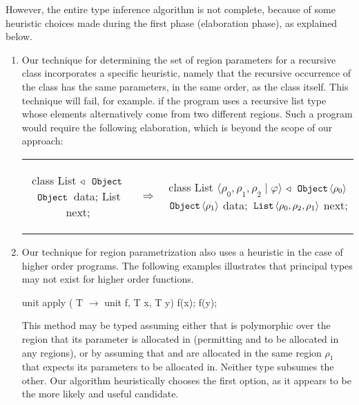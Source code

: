 However, the entire type inference algorithm is not complete, because of some heuristic
choices made during the first phase (elaboration phase), as explained below.

\begin{enumerate}
\item Our technique for determining the set of region parameters for a recursive class
incorporates a specific heuristic, namely that the recursive occurrence of the class has
the same parameters, in the same order, as the class itself. This technique will fail, for
example. if the program uses a recursive list type whose elements alternatively come
from two different regions. Such a program would require the following elaboration,
which is beyond the scope of our approach:
\begin{tabular}{ccc}
\begin{minipage}{0.3\linewidth}
\begin{codejava}
class List
  $\triangleleft$ $\,{\tt Object}\,$
{
  $\,{\tt Object}\,$ data;
  List next;
}
\end{codejava}
\end{minipage}
&
$\Rightarrow$
&
\begin{minipage}{0.5\linewidth}
\begin{codejava}
class List $\langle \rho_0, \rho_1, \rho_2 \; | \; \varphi \rangle$
  $\triangleleft$ $\,{\tt Object}\, \langle \rho_0 \rangle$
{
  $\,{\tt Object}\, \langle \rho_1 \rangle$ data;
  $\,{\tt List}\, \langle \rho_0, \rho_2, \rho_1 \rangle$ next;
}
\end{codejava}
\end{minipage}
\end{tabular}

\item Our technique for region parametrization also uses a heuristic in the case of
higher order programs. The following examples illustrates that principal types may
not exist for higher order functions.
\begin{codejava}
unit apply ( T $\rightarrow$ unit f, T x, T y) {
   f(x); f(y);
}
\end{codejava}
This method may be typed assuming either that  is polymorphic over the region
that its parameter is allocated in (permitting  and  to be allocated in any
regions), or by assuming that  and  are allocated in the same region $\rho_1$
that  expects its parameters to be allocated in. Neither type subsumes the other.
Our algorithm heuristically chooses the first option, as it appears to be the more likely
and useful candidate.


\end{enumerate}
